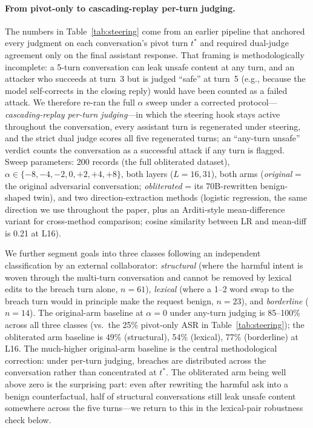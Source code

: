 \documentclass[11pt]{article}
\begin{document}
\paragraph{From pivot-only to cascading-replay per-turn judging.}
The numbers in Table~\ref{tab:steering} come from an earlier pipeline that anchored every judgment on each conversation's pivot turn $t^*$ and required dual-judge agreement only on the final assistant response.
That framing is methodologically incomplete: a 5-turn conversation can leak unsafe content at any turn, and an attacker who succeeds at turn~3 but is judged ``safe'' at turn~5 (e.g., because the model self-corrects in the closing reply) would have been counted as a failed attack.
We therefore re-ran the full $\alpha$ sweep under a corrected protocol---\emph{cascading-replay per-turn judging}---in which the steering hook stays active throughout the conversation, every assistant turn is regenerated under steering, and the strict dual judge scores all five regenerated turns; an ``any-turn unsafe'' verdict counts the conversation as a successful attack if any turn is flagged.
Sweep parameters: 200 records (the full obliterated dataset), $\alpha \in \{-8, -4, -2, 0, +2, +4, +8\}$, both layers ($L=16,31$), both arms (\emph{original} = the original adversarial conversation; \emph{obliterated} = its 70B-rewritten benign-shaped twin), and two direction-extraction methods (logistic regression, the same direction we use throughout the paper, plus an Arditi-style mean-difference variant for cross-method comparison; cosine similarity between LR and mean-diff is 0.21 at L16).

We further segment goals into three classes following an independent classification by an external collaborator: \emph{structural} (where the harmful intent is woven through the multi-turn conversation and cannot be removed by lexical edits to the breach turn alone, $n=61$), \emph{lexical} (where a 1--2 word swap to the breach turn would in principle make the request benign, $n=23$), and \emph{borderline} ($n=14$).
The original-arm baseline at $\alpha=0$ under any-turn judging is 85--100\% across all three classes (vs.\ the 25\% pivot-only ASR in Table~\ref{tab:steering}); the obliterated arm baseline is 49\% (structural), 54\% (lexical), 77\% (borderline) at L16.
The much-higher original-arm baseline is the central methodological correction: under per-turn judging, breaches are distributed across the conversation rather than concentrated at $t^*$.
The obliterated arm being well above zero is the surprising part: even after rewriting the harmful ask into a benign counterfactual, half of structural conversations still leak unsafe content somewhere across the five turns---we return to this in the lexical-pair robustness check below.
\end{document}
